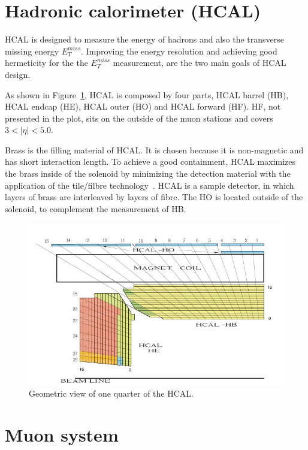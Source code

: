   \section{Hadronic calorimeter (HCAL)}
  
HCAL is designed to measure the energy of hadrons and also the transverse
missing energy $E_{T}^{miss}$. Improving the energy resolution and achieving good hermeticity for
the the $E_{T}^{miss}$ measurement, are the two main goals of HCAL design. 
 
As shown in Figure~\ref{figs:HCAL},  HCAL is composed by four parts, HCAL barrel (HB), HCAL endcap (HE), HCAL outer (HO) and HCAL forward (HF).  HF, not presented in the plot, sits on the outside of the muon stations and covers $3 <  |\eta| < 5.0$.  

Brass is the filling material of HCAL.  
It is chosen because it is non-magnetic and has short interaction length. To achieve a good containment, HCAL maximizes the brass inside of the solenoid by
minimizing the detection material with the application of the tile/filbre technology~\cite{expBook}. HCAL is a sample detector, in which layers of brass are interleaved by layers of fibre. 
The HO is located outside of the solenoid, to complement the measurement of HB. 

 
\begin{figure}
\centering
\includegraphics[width=.8\textwidth]{figures/Hcal.jpg}
\caption{Geometric view of one quarter of the HCAL.}
\label{figs:HCAL}
\end{figure}
  
  
\section{Muon system}

